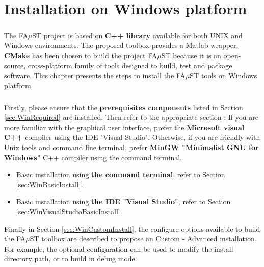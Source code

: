 \chapter{Installation on Windows platform}\label{sec:WinInstall}


\paragraph{}The FA$\mu$ST project is based on \textbf{C++ library} available for both UNIX and Windows environments. The proposed toolbox provides a Matlab wrapper. \textbf{CMake} has been chosen to build the project FA$\mu$ST because it is an open-source, cross-platform family of tools designed to build, test and package software. This chapter presents the steps to install the FA$\mu$ST tools on Windows platform.

\paragraph{}Firstly, please ensure that the \textbf{prerequisites components} listed in Section \ref{sec:WinRequired} are installed. Then refer to the appropriate section : If you are more familiar with the graphical user interface, prefer the \textbf{Microsoft visual C++} compiler using the IDE "Visual Studio". Otherwise, if you are friendly with Unix tools and command line terminal, prefer \textbf{MinGW "Minimalist GNU for Windows"} C++ compiler using the command terminal.  




\begin{itemize}
\item Basic installation using \textbf{the command terminal}, refer to Section \ref{sec:WinBasicInstall}.
\item Basic installation using \textbf{the IDE "Visual Studio"}, refer to Section \ref{sec:WinVisualStudioBasicInstall}. 
\end{itemize}


Finally in Section \ref{sec:WinCustomInstall}, the configure options available to build the FA$\mu$ST toolbox are described to propose an Custom - Advanced installation. For example, the optional configuration can be used to modify the install directory path, or to build in debug mode.  



